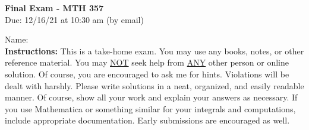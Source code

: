 \documentclass[10pt]{article}
\begin{document}
\begin{center}
{\Large\bf Final Exam - MTH 357}\\
\vspace{.1in}
Due: 12/16/21 at 10:30 am (by email)\\

\end{center}

\noindent Name:\\

\noindent \textbf{Instructions:} This is a take-home exam.  You may use any books, notes, or other reference material.  You may \underline{NOT} seek help from \underline{ANY} other person or online solution. Of course, you are encouraged to ask me for hints.  Violations will be dealt with harshly. Please write solutions in a neat, organized, and easily readable manner.  Of course, show all your work and explain your answers as necessary.  If you use Mathematica or something similar for your integrals and computations, include appropriate documentation. Early submissions are encouraged as well. \\
\end{document}
